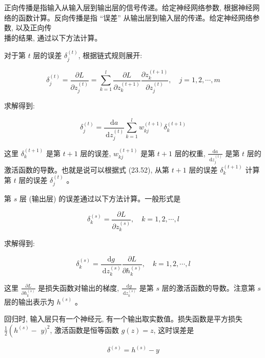 \documentclass[10pt]{article}
\begin{document}
\begin{CJK*}{UTF8}{bsmi}
正向传播是指输入从输入层到输出层的信号传递。给定神经网络参数, 根据神经网络的函数计算。反向传播是指 “误差” 从输出层到输入层的传递。给定神经网络参数, 以及正向传\\
播的结果, 通过以下方法计算。

对于第 $t$ 层的误差 $\delta_{j}^{(t)}$, 根据链式规则展开:


\begin{equation*}
\delta_{j}^{(t)}=\frac{\partial L}{\partial z_{j}^{(t)}}=\sum_{k=1}^{l} \frac{\partial L}{\partial z_{k}^{(t+1)}} \frac{\partial z_{k}^{(t+1)}}{\partial z_{j}^{(t)}}, \quad j=1,2, \cdots, m \tag{23.51}
\end{equation*}


求解得到:


\begin{equation*}
\delta_{j}^{(t)}=\frac{\mathrm{d} a}{\mathrm{~d} z_{j}^{(t)}} \sum_{k=1}^{l} w_{k j}^{(t+1)} \delta_{k}^{(t+1)} \tag{23.52}
\end{equation*}


这里 $\delta_{k}^{(t+1)}$ 是第 $t+1$ 层的误差, $w_{k j}^{(t+1)}$ 是第 $t+1$ 层的权重, $\frac{\mathrm{d} a}{\mathrm{~d} z_{j}^{(t)}}$ 是第 $t$ 层的激活函数的导数。也就是说可以根据式 (23.52), 从第 $t+1$ 层的误差 $\delta_{k}^{(t+1)}$ 计算第 $t$ 层的误差 $\delta_{j}^{(t)}$ 。

第 $s$ 层 (输出层) 的误差通过以下方法计算。一般形式是


\begin{equation*}
\delta_{k}^{(s)}=\frac{\partial L}{\partial z_{k}^{(s)}}, \quad k=1,2, \cdots, l \tag{23.53}
\end{equation*}


求解得到:


\begin{equation*}
\delta_{k}^{(s)}=\frac{\mathrm{d} g}{\mathrm{~d} z_{k}^{(s)}} \frac{\partial L}{\partial h_{k}^{(s)}}, \quad k=1,2, \cdots, l \tag{23.54}
\end{equation*}


这里 $\frac{\partial L}{\partial h_{k}^{(s)}}$ 是损失函数对输出的梯度, $\frac{\mathrm{d} g}{\mathrm{~d} z_{k}^{(s)}}$ 是第 $s$ 层的激活函数的导数。注意第 $s$ 层的输出表示为 $h^{(s)}$ 。

回归时, 输入层只有一个神经元, 有一个输出取实数值。损失函数是平方损失 $\frac{1}{2}\left(h^{(s)}-\right.$ $y)^{2}$, 激活函数是恒等函数 $g(z)=z$, 这时误差是


\begin{equation*}
\delta^{(s)}=h^{(s)}-y \tag{23.55}
\end{equation*}



\end{CJK*}
\end{document}
